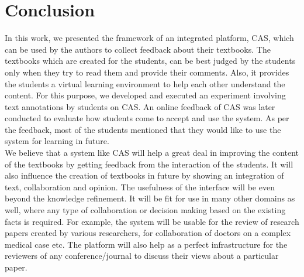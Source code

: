 \documentclass{llncs}
\begin{document}
\section{Conclusion}\label{sec:conclusion}
In this work, we presented the framework of an integrated platform, CAS, which can be used by the authors to collect feedback about their textbooks. The textbooks which are created for the students, can be best judged by the students only when they try to read them and provide their comments. Also, it provides the students a virtual learning environment to help each other understand the content. For this purpose, we developed and executed an experiment involving text annotations by students on CAS. An online feedback of CAS was later conducted to evaluate how students come to accept and use the system. As per the feedback, most of the students mentioned that they would like to use the system for learning in future. \\
We believe that a system like CAS will help a great deal in improving the content of the textbooks by getting feedback from the interaction of the students. It will also influence the creation of textbooks in future by showing an integration of text, collaboration and opinion. The usefulness of the interface will be even beyond the knowledge refinement. It will be fit for use in many other domains as well, where any type of collaboration or decision making based on the existing facts is required. For example, the system will be usable for the review of research papers created by various researchers, for collaboration of doctors on a complex medical case etc. The platform will also help as a perfect infrastructure for the reviewers of any conference/journal to discuss their views about a particular paper.



\end{document}
